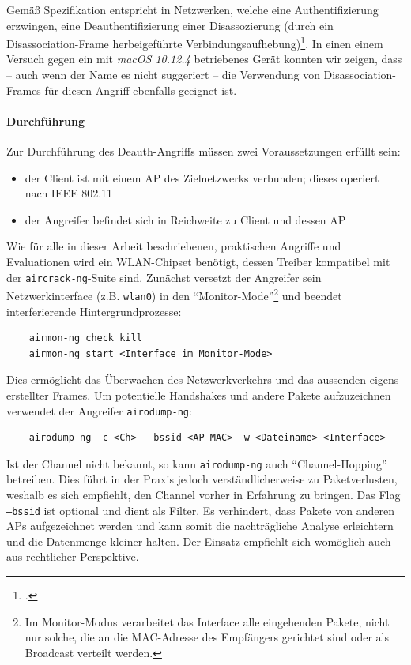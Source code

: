 Gemäß Spezifikation entspricht in Netzwerken, welche eine Authentifizierung erzwingen, eine Deauthentifizierung einer Disassozierung (durch ein Disassociation-Frame herbeigeführte Verbindungsaufhebung)\footcite[S. 74, S. 442]{ieee802.11}. In einen einem Versuch gegen ein mit \textit{macOS 10.12.4} betriebenes Gerät konnten wir zeigen, dass -- auch wenn der Name es nicht suggeriert -- die Verwendung von Disassociation-Frames für diesen Angriff ebenfalls geeignet ist.

\paragraph{Durchführung}
Zur Durchführung des Deauth-Angriffs müssen zwei Voraussetzungen erfüllt sein: 
\begin{itemize}
	\item der Client ist mit einem AP des Zielnetzwerks verbunden; dieses operiert nach IEEE 802.11
	\item der Angreifer befindet sich in Reichweite zu Client und dessen AP
\end{itemize}

Wie für alle in dieser Arbeit beschriebenen, praktischen Angriffe und Evaluationen wird ein WLAN-Chipset benötigt, dessen Treiber kompatibel mit der \texttt{aircrack-ng}-Suite sind. 
Zunächst versetzt der Angreifer sein Netzwerkinterface (z.B. \texttt{wlan0}) in den \enquote{Monitor-Mode}\footnote{Im Monitor-Modus verarbeitet das Interface alle eingehenden Pakete, nicht nur solche, die an die MAC-Adresse des Empfängers gerichtet sind oder als Broadcast verteilt werden.} und beendet interferierende Hintergrundprozesse:

\begin{Verbatim}
	airmon-ng check kill
	airmon-ng start <Interface im Monitor-Mode>
\end{Verbatim}

Dies ermöglicht das Überwachen des Netzwerkverkehrs und das aussenden eigens erstellter Frames.
Um potentielle Handshakes und andere Pakete aufzuzeichnen verwendet der Angreifer \texttt{airodump-ng}:
\begin{Verbatim}
	airodump-ng -c <Ch> --bssid <AP-MAC> -w <Dateiname> <Interface>
\end{Verbatim}
Ist der Channel nicht bekannt, so kann \texttt{airodump-ng} auch \enquote{Channel-Hopping} betreiben. 
Dies führt in der Praxis jedoch verständlicherweise zu Paketverlusten, weshalb es sich empfiehlt, den Channel vorher in Erfahrung zu bringen. Das Flag \texttt{--bssid} ist optional und dient als Filter. Es verhindert, dass Pakete von anderen APs aufgezeichnet werden und kann somit die nachträgliche Analyse erleichtern und die Datenmenge kleiner halten. Der Einsatz empfiehlt sich womöglich auch aus rechtlicher Perspektive.

